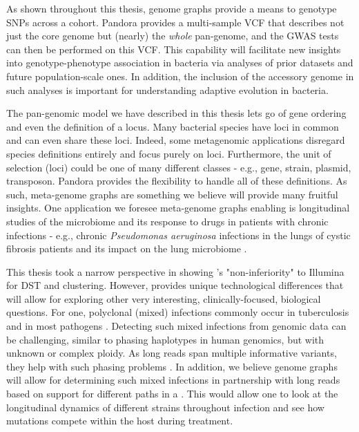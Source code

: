 As shown throughout this thesis, genome graphs provide a means to genotype SNPs across a cohort. Pandora provides a multi-sample VCF that describes not just the core genome but (nearly) the \emph{whole} pan-genome, and the GWAS tests can then be performed on this VCF. This capability will facilitate new insights into genotype-phenotype association in bacteria via analyses of prior datasets and future population-scale ones. In addition, the inclusion of the accessory genome in such analyses is important for understanding adaptive evolution in bacteria.

\noindent
The pan-genomic model we have described in this thesis lets go of gene ordering and even the definition of a locus. Many bacterial species have loci in common and can even share these loci. Indeed, some metagenomic applications disregard species definitions entirely and focus purely on loci. Furthermore, the unit of selection (loci) could be one of many different classes - e.g., gene, strain, plasmid, transposon. Pandora provides the flexibility to handle all of these definitions. As such, meta-genome graphs are something we believe will provide many fruitful insights. One application we foresee meta-genome graphs enabling is longitudinal studies of the microbiome and its response to drugs in patients with chronic infections - e.g., chronic \textit{Pseudomonas aeruginosa} infections in the lungs of cystic fibrosis patients and its impact on the lung microbiome \cite{Boutin2017Chronic}.


\noindent
This thesis took a narrow perspective in showing \ont{}'s "non-inferiority" to Illumina for \mtb{} DST and clustering. However, \ont{} provides unique technological differences that will allow for exploring other very interesting, clinically-focused, biological questions. For one, polyclonal (mixed) infections commonly occur in tuberculosis \cite{Cohen2012} and in most pathogens \cite{Balmer2011}. Detecting such mixed infections from genomic data can be challenging, similar to phasing haplotypes in human genomics, but with unknown or complex ploidy. As long \ont{} reads span multiple informative variants, they help with such phasing problems \cite{Patterson2015WhatsHap}. In addition, we believe genome graphs will allow for determining such mixed infections in partnership with long reads based on support for different paths in a \prg{}. This would allow one to look at the longitudinal dynamics of different strains throughout infection and see how mutations compete within the host during treatment. 

